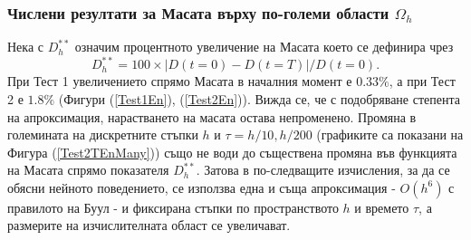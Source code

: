 \documentclass{article}
\newcommand{\be}{\begin{equation}}
\newcommand{\ee}{\end{equation}}
\newcommand{\rf}[1]{(\ref{#1})}
\theoremstyle{remark}
\begin{document}
\subsubsection{Числени резултати за Масата върху по-големи области $\Omega_h$}
Нека с $D_h^{**}$ означим процентното увеличение на Масата което се дефинира чрез
\be
D_h^{**} = 100 \times |D(t=0) - D(t=T)|/D(t=0).
\ee
При Тест 1 увеличението спрямо Масата в началния момент е $0.33\%$, а при Тест 2 е $1.8\%$ (Фигури \rf{Test1En}, \rf{Test2En}). Вижда се, че с подобряване степента на апроксимация, нарастването на масата остава непроменено. Промяна в големината на дискретните стъпки $h$ и $\tau=h/10, h/200$ (графиките са показани на Фигура \rf{Test2TEnMany}) също не води до съществена промяна във функцията на Масата спрямо показателя $D_h^{**}$. Затова в по-следващите изчисления, за да се обясни нейното поведението, се използва една и съща апроксимация - $O(h^6)$ с правилото на Буул - и фиксирана стъпки по пространството $h$ и времето $\tau$, а размерите на изчислителната област се увеличават.
\end{document}
